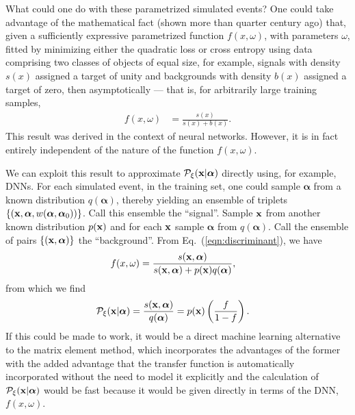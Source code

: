 What could one do with these parametrized simulated events? One could take advantage of the mathematical fact (shown more than quarter century ago) that, given a sufficiently expressive parametrized function $f(x, \omega)$, with parameters $\omega$, fitted by minimizing either the quadratic loss or cross entropy using data comprising two classes of objects of equal size, for example, signals with density $s(x)$ assigned a target of unity and backgrounds with density $b(x)$ assigned a target of zero, then asymptotically --- that is, for arbitrarily large training samples,
\begin{align}
 f(x, \omega) & = \frac{s(x)}{s(x) + b(x)}.
 \label{eqn:discriminant}
\end{align}
This result was derived in the context of neural networks. However, it is in fact entirely independent of the nature of the function
$f(x, \omega)$.

We can exploit this result to approximate $\mathcal{P}_{\xi}({\bf x}|{\boldsymbol\alpha})$ directly using, for example, DNNs. For each simulated event, in the training set, one could sample $\boldsymbol{\alpha}$ from a known distribution $q(\boldsymbol{\alpha})$, thereby yielding an ensemble of triplets $\{ ({\bf x}, \boldsymbol{\alpha}, w(\boldsymbol{\alpha}, \boldsymbol{\alpha}_0)) \}$. Call this ensemble the ``signal''.
Sample ${\bf x}$ from another known distribution $p({\bf x})$ and for each ${\bf x}$ sample $\boldsymbol{\alpha}$ from $q(\boldsymbol{\alpha})$. Call the ensemble of pairs $\{({\bf x}, \boldsymbol{\alpha})\}$ the ``background''.
From Eq.~(\ref{eqn:discriminant}), we have
\begin{align}
 f(x, \omega) & = \frac{s({\bf x}, \boldsymbol{\alpha})}{s({\bf x}, \boldsymbol{\alpha}) + p({\bf x}) q(\boldsymbol{\alpha})},
\end{align}
from which we find
\begin{align}
 \mathcal{P}_{\xi}({\bf x}|{\boldsymbol\alpha}) & = \frac{s({\bf x}, {\boldsymbol\alpha})}{q(\boldsymbol{\alpha})} = p({\bf x}) \left( \frac{f}{1 - f} \right).
\end{align}
If this could be made to work, it would be a direct machine learning alternative to the matrix element method, which incorporates the advantages of the former with the added advantage that the transfer function is automatically incorporated without the need to model it explicitly and the calculation of $\mathcal{P}_{\xi}({\bf x}|{\boldsymbol\alpha})$ would be fast because it would be given directly in terms of the DNN, $f(x, \omega)$.

